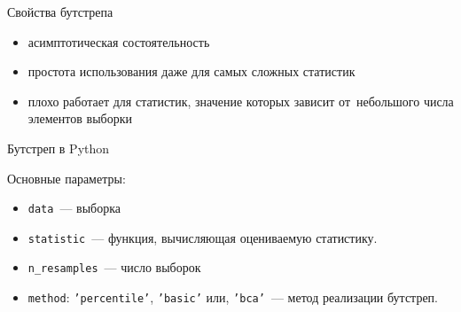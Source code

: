 \documentclass[11pt,pdf,utf8,hyperref={unicode},aspectratio=169]{beamer}
\begin{document}
\begin{frame}{Свойства бутстрепа}
	\begin{itemize}
		\item асимптотическая состоятельность
		\item простота использования даже для самых сложных статистик
		\item плохо работает для статистик, значение которых зависит от~небольшого числа элементов выборки
	\end{itemize}
\end{frame}
\begin{frame}{Бутстреп в Python}{}
    {\centering \ttfamily {}\par}

    \bigskip
    Основные параметры:
    \begin{itemize}
        \item \texttt{data}~--- выборка
        \item \texttt{statistic}~--- функция, вычисляющая оцениваемую статистику.
        \item \texttt{n\_resamples}~--- число выборок
        \item \texttt{method}: \texttt{'percentile'}, \texttt{'basic'} или, \texttt{'bca'}~--- метод реализации бутстреп.
    \end{itemize}
\end{frame}
\end{document}
